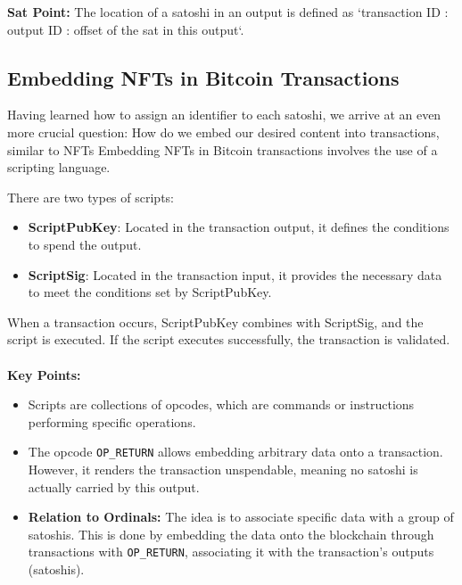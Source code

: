 \textbf{Sat Point:} 
The location of a satoshi in an output is defined as
`transaction ID : output ID : offset of the sat in this output`.

\subsection{Embedding NFTs in Bitcoin Transactions}
Having learned how to assign an identifier to each satoshi, 
we arrive at an even more crucial question: 
How do we embed our desired content into transactions, similar to NFTs
Embedding NFTs in Bitcoin transactions involves the use of a scripting language. 

There are two types of scripts:
\begin{itemize}
    \item \textbf{ScriptPubKey}: Located in the transaction output, it defines the conditions to spend the output.
    \item \textbf{ScriptSig}: Located in the transaction input, it provides the necessary data to meet the conditions set by ScriptPubKey.
\end{itemize}

When a transaction occurs, ScriptPubKey combines with ScriptSig, and the script is executed. If the script executes successfully, the transaction is validated.\\ \\
\textbf{Key Points:}
\begin{itemize}
    \item Scripts are collections of opcodes, which are commands or instructions performing specific operations.
    \item The opcode \texttt{OP\_RETURN} allows embedding arbitrary data onto a transaction. However, it renders the transaction unspendable, meaning no satoshi is actually carried by this output.
    \item \textbf{Relation to Ordinals:} The idea is to associate specific data with a group of satoshis. This is done by embedding the data onto the blockchain through transactions with \texttt{OP\_RETURN}, associating it with the transaction's outputs (satoshis).
\end{itemize}

